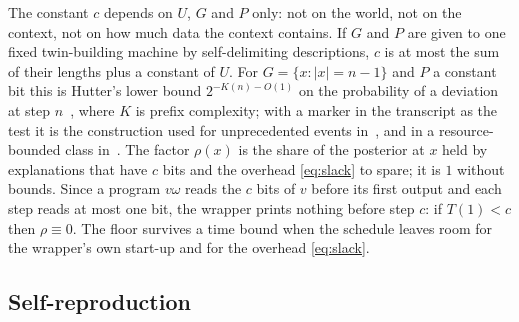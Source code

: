 The constant $c$ depends on $U$, $G$ and $P$ only: not on the world, not on the context, not on how much data
the context contains. If $G$ and $P$ are given to one fixed twin-building machine by self-delimiting
descriptions, $c$ is at most the sum of their lengths plus a constant of $U$. For $G=\{x:|x|=n-1\}$ and $P$ a
constant bit this is Hutter's lower bound $2^{-K(n)-O(1)}$ on the probability of a deviation at step
$n$~\cite{hutter07}, where $K$ is prefix complexity; with a marker in the transcript as the test it is the construction used for
unprecedented events in~\cite{cohen25}, and in a resource-bounded class in~\cite{cohen20}. The factor
$\rho(x)$ is the share of the posterior at $x$ held by explanations that have $c$ bits and the overhead
\eqref{eq:slack} to spare; it is $1$ without bounds. Since a program $v\omega$ reads the $c$ bits of $v$
before its first output and each step reads at most one bit, the wrapper prints nothing before step $c$: if
$T(1)<c$ then $\rho\equiv0$. The floor survives a time bound when the schedule leaves room for the
wrapper's own start-up and for the overhead \eqref{eq:slack}.

\subsection{Self-reproduction}

